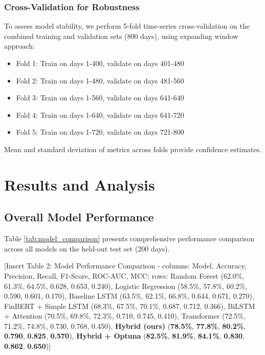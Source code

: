 \documentclass[conference]{IEEEtran}
\begin{document}
\subsubsection{Cross-Validation for Robustness}
To assess model stability, we perform 5-fold time-series cross-validation on the combined training and validation sets (800 days), using expanding window approach:

\begin{itemize}
\item Fold 1: Train on days 1-400, validate on days 401-480
\item Fold 2: Train on days 1-480, validate on days 481-560
\item Fold 3: Train on days 1-560, validate on days 641-640
\item Fold 4: Train on days 1-640, validate on days 641-720
\item Fold 5: Train on days 1-720, validate on days 721-800
\end{itemize}

Mean and standard deviation of metrics across folds provide confidence estimates.

\section{Results and Analysis}

\subsection{Overall Model Performance}

Table \ref{tab:model_comparison} presents comprehensive performance comparison across all models on the held-out test set (200 days).

[Insert Table 2: Model Performance Comparison - columns: Model, Accuracy, Precision, Recall, F1-Score, ROC-AUC, MCC; rows: Random Forest (62.0\%, 61.3\%, 64.5\%, 0.628, 0.653, 0.240), Logistic Regression (58.5\%, 57.8\%, 60.2\%, 0.590, 0.601, 0.170), Baseline LSTM (63.5\%, 62.1\%, 66.8\%, 0.644, 0.671, 0.270), FinBERT + Simple LSTM (68.3\%, 67.5\%, 70.1\%, 0.687, 0.712, 0.366), BiLSTM + Attention (70.5\%, 69.8\%, 72.3\%, 0.710, 0.745, 0.410), Transformer (72.5\%, 71.2\%, 74.8\%, 0.730, 0.768, 0.450), \textbf{Hybrid (ours)} (\textbf{78.5\%}, \textbf{77.8\%}, \textbf{80.2\%}, \textbf{0.790}, \textbf{0.825}, \textbf{0.570}), \textbf{Hybrid + Optuna} (\textbf{82.5\%}, \textbf{81.9\%}, \textbf{84.1\%}, \textbf{0.830}, \textbf{0.862}, \textbf{0.650})]
\end{document}
